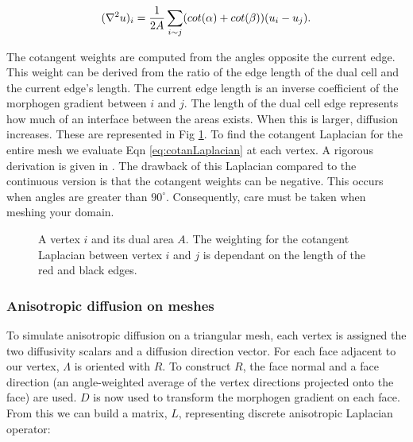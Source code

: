 \begin{equation}
	(\nabla^2{} u)_i = \frac{1}{2A} \sum_{i \sim j} (cot(\alpha) + cot(\beta)) (u_i - u_j).
	\label{eq:cotanLaplacian}
\end{equation}

The cotangent weights are computed from the angles opposite the current edge. This weight can be derived from the ratio of the edge length of the dual cell and the current edge's length. The current edge length is an inverse coefficient of the morphogen gradient between $i$ and $j$. The length of the dual cell edge represents how much of an interface between the areas exists. When this is larger, diffusion increases. These are represented in Fig \ref{fig:dualMesh}. To find the cotangent Laplacian for the entire mesh we evaluate Eqn \ref{eq:cotanLaplacian} at each vertex. A rigorous derivation is given in \cite{Crane2013DGP}. The drawback of this Laplacian compared to the continuous version is that the cotangent weights can be negative. This occurs when angles are greater than $90^\circ$. Consequently, care must be taken when meshing your domain.

\begin{figure}[H]
	\centering
	\caption{A vertex $i$ and its dual area $A$. The weighting for the cotangent Laplacian between vertex $i$ and $j$ is dependant on the length of the red and black edges.}
	\label{fig:dualMesh}
\end{figure}


\subsubsection*{Anisotropic diffusion on meshes}
To simulate anisotropic diffusion on a triangular mesh, each vertex is assigned the two diffusivity scalars and a diffusion direction vector. For each face adjacent to our vertex, $\Lambda$ is oriented with $R$. To construct $R$, the face normal and a face direction (an angle-weighted average of the vertex directions projected onto the face) are used. $D$ is now used to transform the morphogen gradient on each face. From this we can build a matrix, $L$, representing discrete anisotropic Laplacian operator:

